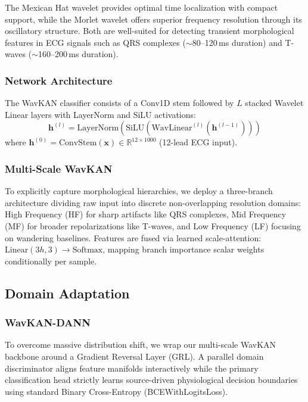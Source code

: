 \documentclass[journal,twoside,web]{ieeecolor}
\begin{document}
The Mexican Hat wavelet provides optimal time localization with compact support, while the Morlet wavelet offers superior frequency resolution through its oscillatory structure. Both are well-suited for detecting transient morphological features in ECG signals such as QRS complexes ($\sim$80--120\,ms duration) and T-waves ($\sim$160--200\,ms duration).

\subsubsection{Network Architecture}
The WavKAN classifier consists of a Conv1D stem followed by $L$ stacked Wavelet Linear layers with LayerNorm and SiLU activations:
\begin{equation}
    \mathbf{h}^{(l)} = \text{LayerNorm}\left(\text{SiLU}\left(\text{WavLinear}^{(l)}(\mathbf{h}^{(l-1)})\right)\right)
\end{equation}
where $\mathbf{h}^{(0)} = \text{ConvStem}(\mathbf{x}) \in \mathbb{R}^{12 \times 1000}$ (12-lead ECG input).

\subsubsection{Multi-Scale WavKAN}
To explicitly capture morphological hierarchies, we deploy a three-branch architecture dividing raw input into discrete non-overlapping resolution domains: High Frequency (HF) for sharp artifacts like QRS complexes, Mid Frequency (MF) for broader repolarizations like T-waves, and Low Frequency (LF) focusing on wandering baselines. Features are fused via learned scale-attention: $\text{Linear}(3h, 3) \to \text{Softmax}$, mapping branch importance scalar weights conditionally per sample.

\subsection{Domain Adaptation}

\subsubsection{WavKAN-DANN}
To overcome massive distribution shift, we wrap our multi-scale WavKAN backbone around a Gradient Reversal Layer (GRL). A parallel domain discriminator aligns feature manifolds interactively while the primary classification head strictly learns source-driven physiological decision boundaries using standard Binary Cross-Entropy (BCEWithLogitsLoss).
\end{document}
